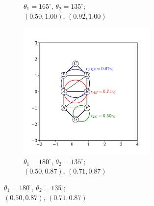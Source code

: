 \begin{figure}[tbp]
\begin{subfigure}[b]{0.32\textwidth}
         \caption{$\theta_1=165^\circ$, $\theta_2=135^\circ$; \\$\left(0.50,1.00\right)$, $\left(0.92,1.00\right)$}
         \label{fig:b4d}
     \end{subfigure}
      \hfill
     \begin{subfigure}[b]{0.32\textwidth}
         \centering
         \includegraphics[width=0.75\textwidth]{./figures/ph/sl_oct_b4_180.pdf}
         \caption{$\theta_1=180^\circ$, $\theta_2=135^\circ$; \\$\left(0.50,0.87\right)$, $\left(0.71,0.87\right)$}
         \label{fig:b4e}
     \end{subfigure}
   

\end{figure}
